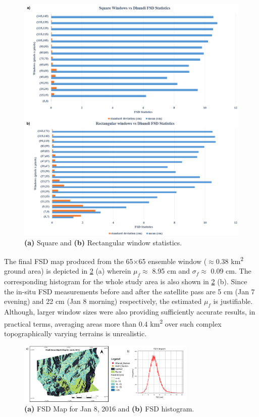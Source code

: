 \documentclass{article}
\begin{document}
\begin{figure}[htb]
\centering
\includegraphics[scale=0.149]{Pictures/Graphs.png}
\vspace{-2ex}
\caption{\textbf{(a)} Square and \textbf{(b)} Rectangular window statistics.}
\label{fig:fsd_graph}
\end{figure}

The final FSD map produced from the 65$\times$65 ensemble window ($\approx$0.38 km\textsuperscript{2} ground area) is depicted in \ref{fig:fsd_map} (a) wherein $\mu_f \approx$ 8.95 cm and $\sigma_f \approx$ 0.09 cm. The corresponding histogram for the whole study area is also shown in \ref{fig:fsd_map} (b). Since the in-situ FSD measurements before and after the satellite pass are 5 cm (Jan 7 evening) and 22 cm (Jan 8 morning) respectively, the estimated $\mu_f$ is justifiable. Although, larger window sizes were also providing sufficiently accurate results, in practical terms, averaging areas more than 0.4 km\textsuperscript{2} over such complex topographically varying terrains is unrealistic.

\begin{figure}[htb]
\centering
\includegraphics[width=8.5cm]{Pictures/FSD_Map.png}
\vspace{-2ex}
\caption{\textbf{(a)} FSD Map for Jan 8, 2016 and \textbf{(b)} FSD histogram.}
\label{fig:fsd_map}
\end{figure}
\end{document}
